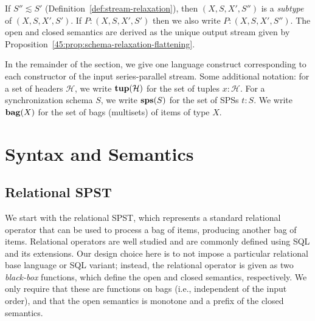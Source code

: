 \begin{definition}
\label{45:def:spst-subtyping}
If $S'' \lesssim S'$ (Definition~\ref{def:stream-relaxation}),
then $(X, S, X', S'')$ is a \emph{subtype} of $(X, S, X', S')$.
If $P: (X, S, X', S')$
then we also write $P: (X, S, X', S'')$.
The open and closed semantics are derived as the unique output stream
given by Proposition~\ref{45:prop:schema-relaxation-flattening}.

\end{definition}

\noindent
In the remainder of the section,
we give one language construct corresponding to each constructor of the input series-parallel stream.
Some additional notation:
for a set of headers $\mathcal{H}$,
we write $\mathbf{tup}(\mathcal{H})$ for the set of tuples $x: \mathcal{H}$.
For a synchronization schema $S$,
we write $\mathbf{sps}(S)$ for the set of SPSs $t: S$.
We write $\mathbf{bag}(X)$ for the set of bags (multisets) of items of type $X$.


\section{Syntax and Semantics}

\subsection{Relational SPST}

We start with the relational SPST, which represents a standard relational operator that can be used to process a bag of items, producing another bag of items.
Relational operators are well studied and are commonly defined using SQL
and its extensions.
Our design choice here is to not impose a particular relational base language
or SQL variant;
instead,
the relational operator is given as two \emph{black-box} functions,
which define the open and closed semantics,
respectively.
We only require that these are functions on bags (i.e., independent of the input order),
and that the open semantics is monotone and a prefix
of the closed semantics.

